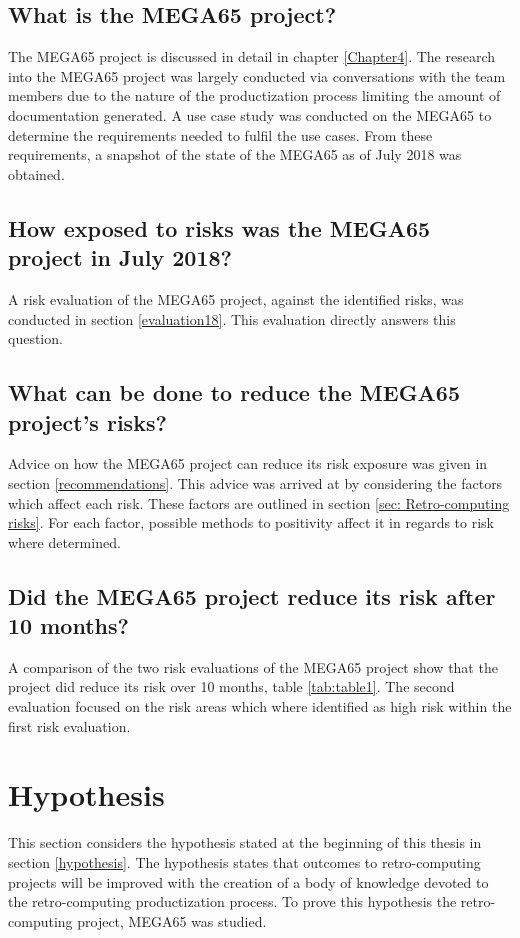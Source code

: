 \subsection{What is the MEGA65 project?}
The MEGA65 project is discussed in detail in chapter \ref{Chapter4}. The research into the MEGA65 project was largely conducted via conversations with the team members due to the nature of the productization process limiting the amount of documentation generated. A use case study was conducted on the MEGA65 to determine the requirements needed to fulfil the use cases. From these requirements, a snapshot of the state of the MEGA65 as of July 2018 was obtained.

\subsection{How exposed to risks was the MEGA65 project in July 2018?}
A risk evaluation of the MEGA65 project, against the identified risks, was conducted in section \ref{evaluation18}. This evaluation directly answers this question. 

\subsection{What can be done to reduce the MEGA65 project's risks?}
Advice on how the MEGA65 project can reduce its risk exposure was given in section \ref{recommendations}. This advice was arrived at by considering the factors which affect each risk. These factors are outlined in section \ref{sec: Retro-computing risks}. For each factor, possible methods to positivity affect it in regards to risk where determined.

\subsection{Did the MEGA65 project reduce its risk after 10 months?}
A comparison of the two risk evaluations of the MEGA65 project show that the project did reduce its risk over 10 months, table \ref{tab:table1}. The second evaluation focused on the risk areas which where identified as high risk within the first risk evaluation. 

\section{Hypothesis}
This section considers the hypothesis stated at the beginning of this thesis in section \ref{hypothesis}. The hypothesis states that outcomes to retro-computing projects will be improved with the creation of a body of knowledge devoted to the retro-computing productization process. To prove this hypothesis the retro-computing project, MEGA65 was studied. 

